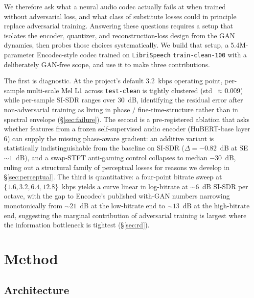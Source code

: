\documentclass[11pt]{article}
\begin{document}
We therefore ask what a neural audio codec actually fails at when
trained without adversarial loss, and what class of substitute losses
could in principle replace adversarial training. Answering these
questions requires a setup that isolates the encoder, quantizer, and
reconstruction-loss design from the GAN dynamics, then probes those
choices systematically. We build that setup, a 5.4M-parameter
Encodec-style codec trained on \texttt{LibriSpeech}
\texttt{train-clean-100} with a deliberately GAN-free scope, and use
it to make three contributions.

The first is diagnostic. At the project's default 3.2~kbps operating
point, per-sample multi-scale Mel L1 across \texttt{test-clean} is
tightly clustered (std~$\approx 0.009$) while per-sample SI-SDR
ranges over 30~dB, identifying the residual error after non-adversarial
training as living in phase / fine-time-structure rather than in
spectral envelope (\S\ref{sec:failure}).
The second is a pre-registered ablation that asks whether features
from a frozen self-supervised audio encoder (HuBERT-base layer 6)
can supply the missing phase-aware gradient: an additive variant is
statistically indistinguishable from the baseline on SI-SDR
($\Delta = -0.82$~dB at SE $\sim 1$~dB), and a swap-STFT
anti-gaming control collapses to median $-30$~dB, ruling out a
structural family of perceptual losses for reasons we develop in
\S\ref{sec:perceptual}.
The third is quantitative: a four-point bitrate sweep at
$\{1.6, 3.2, 6.4, 12.8\}$~kbps yields a curve linear in log-bitrate
at $\sim 6$~dB SI-SDR per octave, with the gap to Encodec's
published with-GAN numbers narrowing monotonically from $\sim 21$~dB
at the low-bitrate end to $\sim 13$~dB at the high-bitrate end,
suggesting the marginal contribution of adversarial training is
largest where the information bottleneck is tightest
(\S\ref{sec:rd}).

\section{Method}
\label{sec:method}

\subsection{Architecture}
\label{sec:arch}
\end{document}
